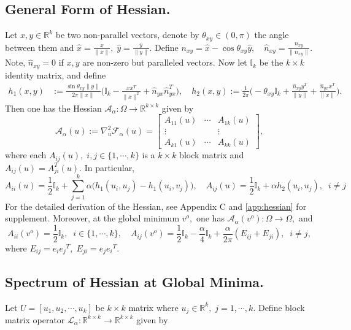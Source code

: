 \documentclass{amsart}%
\begin{document}
\subsection{General Form of Hessian.}\label{sec:3.1} Let $x,y\in \mathbb R^k$ be two non-parallel vectors, denote by $\theta_{xy}\in (0,\pi)$ the angle between them and $\hat{x}=\frac{x}{\|x\|},\; \hat{y}=\frac{y}{\|y\|}.$ Define
$n_{xy}=\hat{x}-\cos\theta_{xy}\hat{y},\quad \hat{n}_{xy}=\frac{n_{xy}}{\|n_{xy}\|}.$
Note, $\hat{n}_{xy}=0$ if $x,y$ are non-zero but paralleled vectors. Now let $\mathbb I_k$ be the $k\times k$ identity matrix, and define 
\begin{align*}
h_1(x,y)&:=\frac{\sin\theta_{xy}\|y\|}{2\pi\|x\|}\Big(\mathbb I_k-\frac{xx^T}{\|x\|^2}+\hat{n}_{yx}\hat{n}_{yx}^T\Big),\quad
h_2(x,y):=\frac{1}{2\pi}\Big(-\theta_{xy}\mathbb I_k+\frac{\hat{n}_{xy}y^T}{\|y\|}+\frac{\hat{n}_{yx}x^T}{\|x\|}\Big).
\end{align*}
Then one has the Hessian $\mathcal A_{\alpha}:\Omega\to \mathbb R^{k\times k}$ given by
\[
\mathcal A_{\alpha}(u):=\nabla^2_{u}\mathcal F_{\alpha}(u)=
\begin{bmatrix}
    A_{11}(u)&\cdots&A_{1k}(u)\\
    \vdots&&\vdots\\
    A_{k1}(u)&\cdots&A_{kk}(u)
\end{bmatrix},
\]
where each $A_{ij}(u), \; i,j\in \{1,\cdots,k\}$ is a $k\times k$ block matrix and $A_{ij}(u)=A^T_{ji}(u).$ In particular,
\begin{equation}\label{eq:hessian}
A_{ii}(u)=\frac{1}{2}\mathbb I_k+\sum_{j=1}^k \alpha\Big(h_1(u_i,u_j)-h_1(u_i,v_j)\Big),\quad   
A_{ij}(u)=\frac{1}{2}\mathbb I_k+\alpha h_2(u_i,u_j),\;\; i\neq j
\end{equation}
For the detailed derivation of the Hessian, see \cite{Hessian2020} Appendix C and \ref{app:hessian} for supplement.\vskip0.3cm
\noindent Moreover, at the global minimum $v^o,$ one has $\mathcal A_{\alpha}(v^o):\Omega \to  \Omega,$ and 
\begin{equation}\label{eq:spe_I}
A_{ii}( v^o)=\frac{1}{2}\mathbb{I}_k, \;\;i\in\{1,\cdots,k\},\quad
A_{ij}( v^o)=\frac{1}{2}\mathbb I_k-\frac{\alpha}{4}\mathbb I_k+\frac{\alpha}{2\pi}(E_{ij}+E_{ji}),\;\; i\neq j,
\end{equation}
where $E_{ij}=e_i{e_j}^T,\; E_{ji}=e_j{e_i}^T.$\vskip 0.3cm
\noindent \subsection{ Spectrum of Hessian at Global Minima.}\label{sec:3.2} Let $U=[u_1,u_2,\cdots, u_k]$ be $k\times k$ matrix where $u_j\in \mathbb R^k,\; j=1,\cdots,k.$ Define block matrix operator $\mathcal L_{\alpha}:\mathbb R^{k\times k}\to \mathbb R^{k\times k}$ given by
\end{document}
